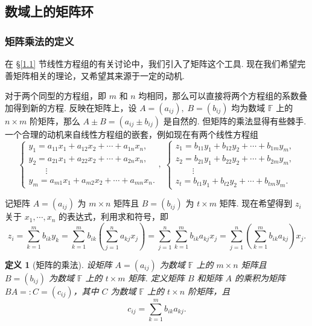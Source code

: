 \documentclass[10pt,openany]{article}
\theoremstyle{thmstyle} %
\theoremstyle{defstyle} %
\newtheorem{definition}[theorem]{定义}
\theoremstyle{prostyle} %
\theoremstyle{exastyle}
\theoremstyle{remstyle}
\newcommand{\F}{\mathbb{F}}
\begin{document}
\subsection{数域上的矩阵环}

\subsubsection{矩阵乘法的定义}

在 \S \ref{1.1} 节线性方程组的有关讨论中，我们引入了矩阵这个工具. 现在我们希望完善矩阵相关的理论，又希望其来源于一定的动机. 

对于两个同型的方程组，即 \( m \) 和 \( n \) 均相同，那么可以直接将两个方程组的系数叠加得到新的方程. 反映在矩阵上，设 \( A=(a_{ij}), \; B=(b_{ij}) \) 均为数域 \( \F \) 上的 \( n \times m \) 阶矩阵，那么 \( A \pm B=(a_{ij} \pm b_{ij}) \) 是自然的. 但矩阵的乘法显得有些棘手. 一个合理的动机来自线性方程组的嵌套，例如现在有两个线性方程组
\[ \left\{ \begin{array}{l}
	y_1= a_{11}x_1+a_{12}x_2+\cdots+a_{1n}x_n, \\
	y_2= a_{21}x_1+a_{22}x_2+\cdots+a_{2n}x_n, \\
	\qquad \vdots \\
	y_m= a_{m1}x_1+a_{m2}x_2+\cdots+a_{mn}x_n.
\end{array}\right. , \; \left\{ \begin{array}{l}
z_1= b_{11}y_1+b_{12}y_2+\cdots+b_{1m}y_m, \\
z_2= b_{21}y_1+b_{22}y_2+\cdots+b_{2m}y_m, \\
\qquad \vdots \\
z_t= b_{t1}y_1+b_{t2}y_2+\cdots+b_{tm}y_m.
\end{array}\right. \]

记矩阵 \( A=(a_{ij}) \) 为 \( m \times n \) 矩阵且 \( B=(b_{ij}) \) 为 \( t\times m \) 矩阵. 现在希望得到 \( z_i \) 关于 \( x_1,\cdots,x_n \) 的表达式，利用求和符号，即
\[ z_i=\sum_{k=1}^{m} b_{ik}y_k= \sum_{k=1}^{m} b_{ik} \left( \sum_{j=1}^{n} a_{kj} x_j \right)= \sum_{j=1}^{n} \sum_{k=1}^{m} b_{ik}a_{kj} x_j = \sum_{j=1}^{n} \left( \sum_{k=1}^{m} b_{ik}a_{kj}\right) x_j. \]

\begin{definition}[矩阵的乘法]	\label{1.3.1}
	设矩阵 \( A=(a_{ij}) \) 为数域 \( \F \) 上的 \( m \times n \) 矩阵且 \( B=(b_{ij}) \) 为数域 \( \F \) 上的 \( t\times m \) 矩阵. 定义矩阵 \( B \) 和矩阵 \( A \) 的乘积为矩阵 \( BA=:C=(c_{ij}) \)，其中 \( C \) 为数域 \( \F \) 上的 \( t \times n \) 阶矩阵，且
	\[ c_{ij}=\sum_{k=1}^{m} b_{ik}a_{kj}. \] 

\end{definition}
\end{document}
